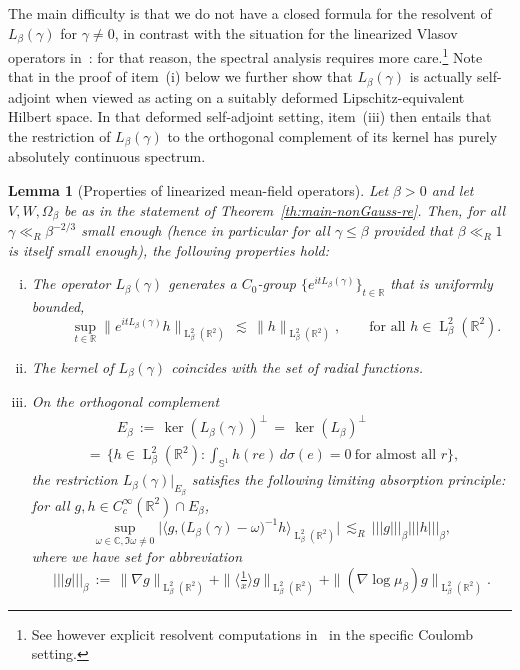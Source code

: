 \documentclass[a4paper,11pt,reqno,noindent]{amsart}
\theoremstyle{plain}
\newtheorem{lem}{Lemma}[section]
\numberwithin{equation}{section}
\newcommand{\R}{\mathbb R}
\newcommand{\C}{\mathbb C}
\newcommand{\Sp}{\mathbb S}
\newcommand{\3}{|\!|\!|}
\newcommand{\Ld}{\operatorname{L}}
\begin{document}
The main difficulty is that we do not have a closed formula for the resolvent of $L_\beta(\gamma)$ for $\gamma\ne0$, in contrast with the situation for the linearized Vlasov operators in~\cite{DSR-21}: for that reason, the spectral analysis requires more care.\footnote{See however explicit resolvent computations in~\cite{Chavanis-12a,Chavanis-12b} in the specific Coulomb setting.}
Note that in the proof of item~(i) below we further show that $L_\beta(\gamma)$ is actually self-adjoint when viewed as acting on a suitably deformed Lipschitz-equivalent Hilbert space. In that deformed self-adjoint setting, item~(iii) then entails that the restriction of $L_\beta(\gamma)$ to the orthogonal complement of its kernel has purely absolutely continuous spectrum.

\begin{lem}[Properties of linearized mean-field operators]\label{lem:nonGaus}
{Let $\beta>0$ and let $V,W,\Omega_\beta$ be as in the statement of Theorem~\ref{th:main-nonGauss-re}.}
Then, for all $\gamma\ll_R\beta^{-2/3}$ small enough (hence in particular for all $\gamma\le\beta$ provided that $\beta\ll_R1$ is itself small enough), the following properties hold:
\begin{enumerate}[(i)]
\item The operator $L_\beta(\gamma)$ generates a $C_0$-group $\{e^{itL_\beta(\gamma)}\}_{t\in\R}$ that is uniformly bounded,
\[\qquad\sup_{t\in\R}\|e^{itL_\beta(\gamma)}h\|_{\Ld^2_\beta(\R^2)}\,\lesssim\,\|h\|_{\Ld^2_\beta(\R^2)},\qquad\text{for all $h\in\Ld^2_\beta(\R^2)$}.\]
\item The kernel of $L_\beta(\gamma)$ coincides with the set of radial functions.
\smallskip\item On the orthogonal complement
\begin{multline}\label{eq:def-Ebeta}
\hspace{1cm}\textstyle E_\beta\,:=\,\ker(L_\beta(\gamma))^\bot
\,=\,\ker(L_\beta)^\bot\\
\,=\,\bigg\{h\in\Ld^2_\beta(\R^2):\int_{\Sp^1}h(re)\,d\sigma(e)=0~\text{for almost all $r$}\bigg\},
\end{multline}
the restriction $L_\beta(\gamma)|_{E_\beta}$
satisfies the following limiting absorption principle: for all $g,h\in C^\infty_c(\R^2)\cap E_\beta$,
\begin{equation}\label{eq:LAP-Lbeta}
\sup_{\omega\in\C,\Im\omega\ne0}\big|\big\langle g,\big(L_\beta(\gamma)-\omega\big)^{-1}h\big\rangle_{\Ld^2_\beta(\R^2)}\big|
\,\lesssim_R\,\3g\3_\beta\3h\3_\beta,
\end{equation}
where we have set for abbreviation
\begin{equation}\label{eq:def-N3}
\3g\3_\beta\,:=\,\|\nabla g\|_{\Ld^2_\beta(\R^2)}
+\|\langle\tfrac1{x}\rangle g\|_{\Ld^2_\beta(\R^2)}
+\|(\nabla\log\mu_\beta)g\|_{\Ld^2_\beta(\R^2)}.
\end{equation}
\end{enumerate}
\end{lem}
\end{document}
